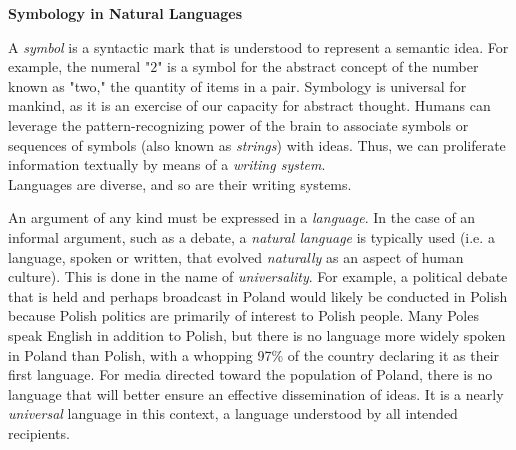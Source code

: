 \begin{tcolorbox}[breakable, enhanced, colback=textbook-blue, sharp corners]
	\vspace{2mm}
	\begin{center}
		\textbf{Symbology in Natural Languages}
	\end{center}
	\vspace{1mm}
	
	A \textit{symbol} is a syntactic mark that is understood to represent a semantic idea. For example, the numeral "$2$" is a symbol for the abstract concept of the number known as "two," the quantity of items in a pair. Symbology is universal for mankind, as it is an exercise of our capacity for abstract thought. Humans can leverage the pattern-recognizing power of the brain to associate symbols or sequences of symbols (also known as \textit{strings}) with ideas. Thus, we can proliferate information textually by means of a \textit{writing system}. \\
	
	Languages are diverse, and so are their writing systems.
	\vspace{1mm}
\end{tcolorbox}
\vspace{7mm}


An argument of any kind must be expressed in a \textit{language}. In the case of an informal argument, such as a debate, a \textit{natural language} is typically used (i.e. a language, spoken or written, that evolved \textit{naturally} as an aspect of human culture). This is done in the name of \textit{universality}. For example, a political debate that is held and perhaps broadcast in Poland would likely be conducted in Polish because Polish politics are primarily of interest to Polish people. Many Poles speak English in addition to Polish, but there is no language more widely spoken in Poland than Polish, with a whopping 97\% of the country declaring it as their first language. For media directed toward the population of Poland, there is no language that will better ensure an effective dissemination of ideas. It is a nearly \textit{universal} language in this context, a language understood by all intended recipients. \\

